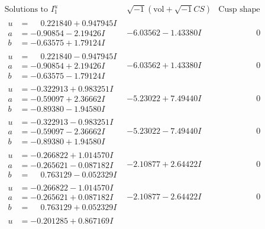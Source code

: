\documentclass[1p]{elsarticle_modified}
\theoremstyle{definition}
\newcommand{\I}{\sqrt{-1}}
\begin{document}
$$\begin{array}{c|c|c}  
\text{Solutions to }I^u_{1}& \I (\text{vol} + \sqrt{-1}CS) & \text{Cusp shape}\\
 \hline 
\begin{aligned}
u &= \phantom{-}0.221840 + 0.947945 I \\
a &= -0.90854 - 2.19426 I \\
b &= -0.63575 + 1.79124 I\end{aligned}
 & -6.03562 - 1.43380 I & \phantom{-0.000000 } 0 \\ \hline\begin{aligned}
u &= \phantom{-}0.221840 - 0.947945 I \\
a &= -0.90854 + 2.19426 I \\
b &= -0.63575 - 1.79124 I\end{aligned}
 & -6.03562 + 1.43380 I & \phantom{-0.000000 } 0 \\ \hline\begin{aligned}
u &= -0.322913 + 0.983251 I \\
a &= -0.59097 + 2.36662 I \\
b &= -0.89380 - 1.94580 I\end{aligned}
 & -5.23022 + 7.49440 I & \phantom{-0.000000 } 0 \\ \hline\begin{aligned}
u &= -0.322913 - 0.983251 I \\
a &= -0.59097 - 2.36662 I \\
b &= -0.89380 + 1.94580 I\end{aligned}
 & -5.23022 - 7.49440 I & \phantom{-0.000000 } 0 \\ \hline\begin{aligned}
u &= -0.266822 + 1.014570 I \\
a &= -0.265621 - 0.087182 I \\
b &= \phantom{-}0.763129 - 0.052329 I\end{aligned}
 & -2.10877 + 2.64422 I & \phantom{-0.000000 } 0 \\ \hline\begin{aligned}
u &= -0.266822 - 1.014570 I \\
a &= -0.265621 + 0.087182 I \\
b &= \phantom{-}0.763129 + 0.052329 I\end{aligned}
 & -2.10877 - 2.64422 I & \phantom{-0.000000 } 0 \\ \hline\begin{aligned}
u &= -0.201285 + 0.867169 I \\

\end{aligned}
\end{array}$$
\end{document}
